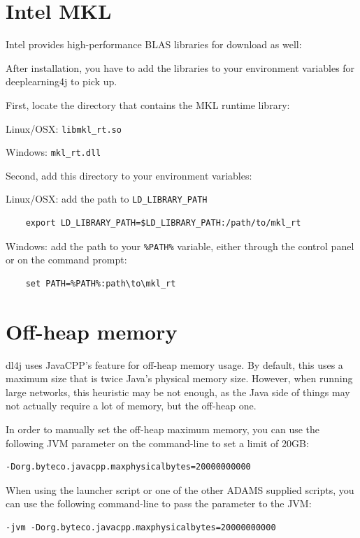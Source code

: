 \documentclass[a4paper]{book}
\begin{document}
\chapter{Intel MKL}
Intel provides high-performance BLAS libraries for download as well\cite{mkl}:

After installation, you have to add the libraries to your environment
variables for deeplearning4j to pick up.

\noindent First, locate the directory that contains the MKL runtime library:
\begin{tight_itemize}
  \item Linux/OSX: \texttt{libmkl\_rt.so}
  \item Windows: \texttt{mkl\_rt.dll}
\end{tight_itemize}

\noindent Second, add this directory to your environment variables:
\begin{tight_itemize}
  \item Linux/OSX: add the path to \texttt{LD\_LIBRARY\_PATH}
    \begin{verbatim}
    export LD_LIBRARY_PATH=$LD_LIBRARY_PATH:/path/to/mkl_rt
    \end{verbatim}
  \item Windows: add the path to your \texttt{\%PATH\%} variable, either
  through the control panel or on the command prompt:
    \begin{verbatim}
    set PATH=%PATH%:path\to\mkl_rt
    \end{verbatim}
\end{tight_itemize}


\chapter{Off-heap memory}
dl4j uses JavaCPP's feature for off-heap memory usage. By default, this uses
a maximum size that is twice Java's physical memory size. However, when
running large networks, this heuristic may be not enough, as the Java side
of things may not actually require a lot of memory, but the off-heap one.

In order to manually set the off-heap maximum memory, you can use the following
JVM parameter on the command-line to set a limit of 20GB:
\begin{verbatim}
-Dorg.byteco.javacpp.maxphysicalbytes=20000000000
\end{verbatim}

When using the launcher script or one of the other ADAMS supplied scripts, you
can use the following command-line to pass the parameter to the JVM:
\begin{verbatim}
-jvm -Dorg.byteco.javacpp.maxphysicalbytes=20000000000
\end{verbatim}


\end{document}
